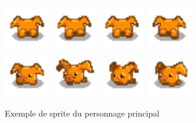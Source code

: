\documentclass{article}
\begin{document}
\begin{figure}[!h]
        \\
        \includegraphics[height = 2cm]{haricot/back_0.png}
        \includegraphics[height = 2cm]{haricot/back_1.png}
        \includegraphics[height = 2cm]{haricot/back_2.png}
        \includegraphics[height = 2cm]{haricot/back_3.png}
        \\
        \includegraphics[height = 2cm]{haricot/left_0.png}
        \includegraphics[height = 2cm]{haricot/left_1.png}
        \includegraphics[height = 2cm]{haricot/left_2.png}
        \includegraphics[height = 2cm]{haricot/left_3.png}
        \caption{Exemple de sprite du personnage principal}\label{lapin_devant}
    \end{figure}
\end{document}
